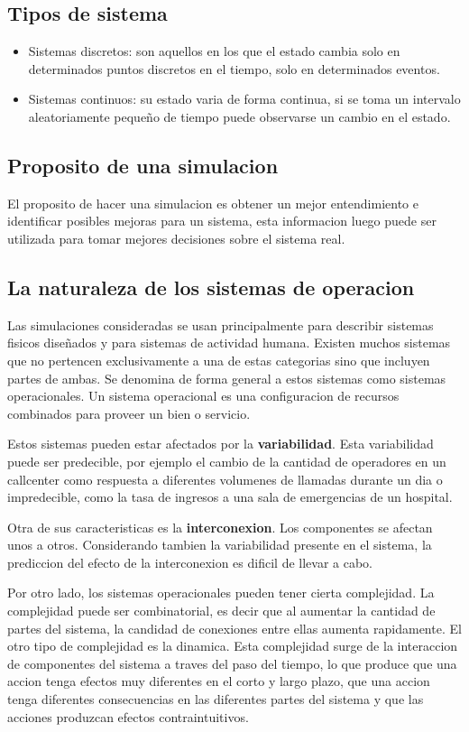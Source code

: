 \documentclass[a4paper]{article}
\begin{document}
\subsection*{Tipos de sistema}
\begin{itemize}
    \item Sistemas discretos: son aquellos en los que el estado cambia solo 
    en determinados puntos discretos en el tiempo, solo en determinados eventos.
    \item Sistemas continuos: su estado varia de forma continua, si se toma un 
    intervalo aleatoriamente pequeño de tiempo puede observarse un cambio en el 
    estado.
\end{itemize}
\subsection{Proposito de una simulacion}
El proposito de hacer una simulacion es obtener un mejor entendimiento e
identificar posibles mejoras para un sistema, esta informacion luego puede
ser utilizada para tomar mejores decisiones sobre el sistema real.

\subsection{La naturaleza de los sistemas de operacion}
Las simulaciones consideradas se usan principalmente para describir
sistemas fisicos diseñados y para sistemas de actividad humana.
Existen muchos sistemas que no pertencen exclusivamente a una de estas
categorias sino que incluyen partes de ambas. Se denomina de forma general
a estos sistemas como sistemas operacionales. Un sistema operacional es
una configuracion de recursos combinados para proveer un bien o servicio.

Estos sistemas pueden estar afectados por la \textbf{variabilidad}. Esta 
variabilidad puede ser predecible, por ejemplo el cambio de la cantidad
de operadores en un callcenter como respuesta a diferentes volumenes de 
llamadas durante un dia o impredecible, como la tasa de ingresos a una
sala de emergencias de un hospital.

Otra de sus caracteristicas es la \textbf{interconexion}. Los componentes
se afectan unos a otros. Considerando tambien la variabilidad presente
en el sistema, la prediccion del efecto de la interconexion es dificil
de llevar a cabo.

Por otro lado, los sistemas operacionales pueden tener cierta complejidad.
La complejidad puede ser combinatorial, es decir que al aumentar la
cantidad de partes del sistema, la candidad de conexiones entre ellas
aumenta rapidamente.
El otro tipo de complejidad es la dinamica. Esta complejidad surge de
la interaccion de componentes del sistema a traves del paso del tiempo,
lo que produce que una accion tenga efectos muy diferentes en el corto y
largo plazo, que una accion tenga diferentes consecuencias en las diferentes
partes del sistema y que las acciones produzcan efectos contraintuitivos.
\end{document}
